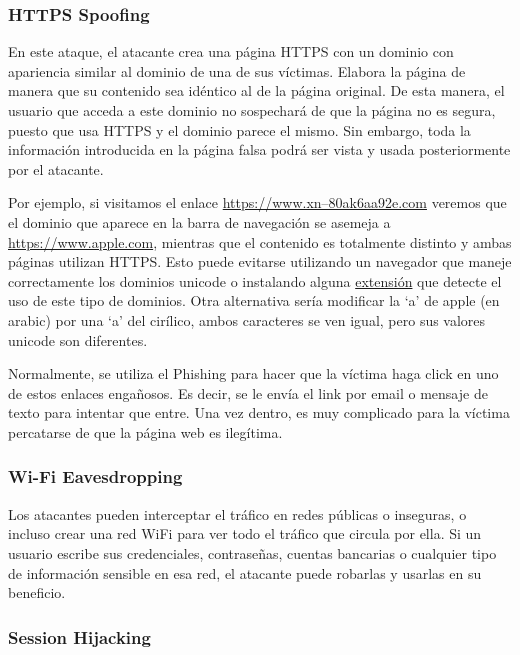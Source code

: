 \documentclass[11pt]{article}
\begin{document}
 \subsubsection*{HTTPS Spoofing}
 
 En este ataque, el atacante crea una página HTTPS con un dominio con apariencia similar al dominio de una de sus víctimas. Elabora la página de manera que su contenido sea idéntico al de la página original. De esta manera, el usuario que acceda a este dominio no sospechará de que la página no es segura, puesto que usa HTTPS y el dominio parece el mismo. Sin embargo, toda la información introducida en la página falsa podrá ser vista y usada posteriormente por el atacante.
 
 Por ejemplo, si visitamos el enlace \href{https://www.xn--80ak6aa92e.com}{https://www.xn--80ak6aa92e.com} veremos que el dominio que aparece en la
  barra de navegación se asemeja a \href{https://www.apple.com}{https://www.apple.com}, mientras que el contenido es totalmente distinto y ambas páginas
   utilizan HTTPS. Esto puede evitarse utilizando un navegador que maneje correctamente los dominios unicode o instalando alguna
  \href{https://github.com/yabirgb/punycodeAlert}{extensión} que detecte
 el uso de este tipo de dominios. Otra alternativa sería modificar la `a' de apple (en arabic) por una `a' del cirílico, ambos caracteres se ven
 igual, pero sus valores unicode son diferentes.
 
 Normalmente, se utiliza el Phishing para hacer que la víctima haga click en uno de estos enlaces engañosos. Es decir, se le envía el link por
 email o mensaje de texto para intentar que entre. Una vez dentro, es muy complicado para la víctima percatarse de que la página web es ilegítima.
 
 \subsubsection*{Wi-Fi Eavesdropping}
 
 Los atacantes pueden interceptar el tráfico en redes públicas o inseguras, o incluso crear una red WiFi para ver todo el tráfico que circula por ella. Si un usuario escribe sus credenciales, contraseñas, cuentas bancarias o cualquier tipo de información sensible en esa red, el atacante puede robarlas y usarlas en su beneficio.
 
 \subsubsection*{Session Hijacking}
 
\end{document}

